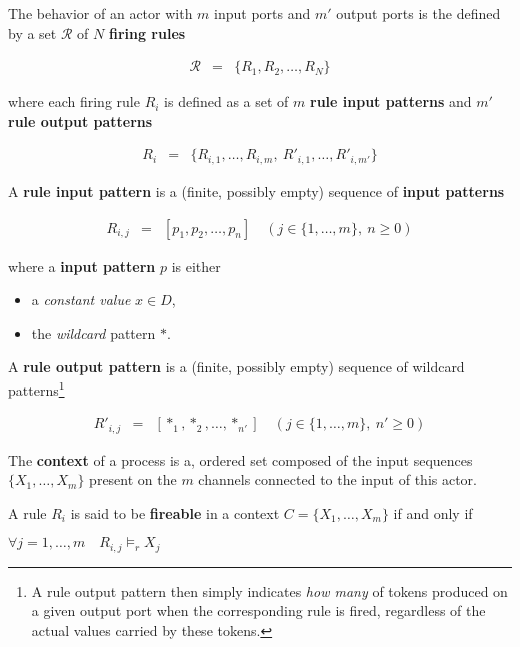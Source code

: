 \medskip
\noindent
The behavior of an actor with $m$ input ports and $m'$ output ports is the defined by a set
$\mathcal{R}$ of $N$ \textbf{firing rules}

\begin{eqnarray*}
  \mathcal{R} & = & \{ R_1, R_2, \ldots, R_N \}
\end{eqnarray*}

where each firing rule $R_i$ is defined as a set of $m$ \textbf{rule input patterns} and $m'$ \textbf{rule
output patterns}

\begin{eqnarray*}
  R_i & = & \{ R_{i,1}, \ldots, R_{i,m},\ R'_{i,1}, \ldots, R'_{i,m'} \}
\end{eqnarray*}

\medskip
\noindent
A \textbf{rule input pattern} is a (finite, possibly empty) sequence of \textbf{input patterns} 

\begin{eqnarray*}
  R_{i,j} & = & [ p_1, p_2, \ldots, p_n ] \quad (j \in \{1,\ldots,m\},\ n \geq 0)
\end{eqnarray*}

where a \textbf{input pattern} $p$ is either
\begin{itemize}
\item a \emph{constant value} $x \in D$,
\item the \emph{wildcard} pattern $*$.
\end{itemize}

\medskip
\noindent
A \textbf{rule output pattern} is a (finite, possibly empty) sequence of wildcard
patterns\footnote{A rule output pattern then simply indicates  \emph{how many} of tokens produced
  on a given output port when the corresponding rule is fired, regardless of the actual values
  carried by these tokens.} 

\begin{eqnarray*}
  R'_{i,j} & = & [ *_1, *_2, \ldots, *_{n'} ] \quad (j \in \{1,\ldots,m\},\ n' \geq 0)
\end{eqnarray*}

\medskip
\noindent
The \textbf{context} of a process is a, ordered set composed of the input sequences $\{X_1,\ldots,X_m\}$
present on the $m$ channels connected to the input of this actor.

\medskip
\noindent
A rule $R_i$ is said to be \textbf{fireable} in a context $C=\{X_1,\ldots,X_m\}$ if and only if

\begin{center}
  \begin{math}
    \forall j=1,\ldots,m \quad R_{i,j} \models_r X_j
  \end{math}
\end{center}

